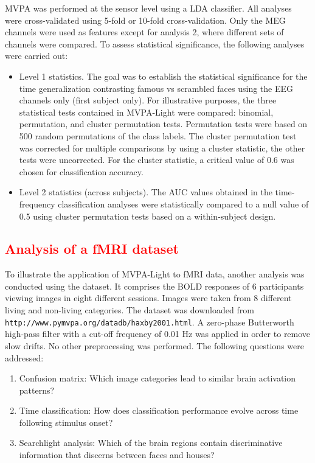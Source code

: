 \documentclass[utf8]{frontiersSCNS} %
\newcommand{\ttt}[1]{\texttt{#1}}
\newcommand{\red}[1]{\textcolor{red}{#1}}
\begin{document}
MVPA was performed at the sensor level using a LDA classifier. All analyses were cross-validated using 5-fold or 10-fold cross-validation. Only the MEG channels were used as features except for analysis 2, where different sets of channels were compared. To assess statistical significance, the following analyses were carried out:

\begin{itemize}
    \item Level 1 statistics. The goal was to establish the statistical significance for the time generalization contrasting famous vs scrambled faces using the EEG channels only (first subject only). For illustrative purposes, the three statistical tests contained in MVPA-Light were compared: binomial, permutation, and cluster permutation tests. Permutation tests were based on 500 random permutations of the class labels. The cluster permutation test was corrected for multiple comparisons by using a cluster statistic, the other tests were uncorrected. For the cluster statistic, a critical value of 0.6 was chosen for  classification accuracy.
    \item Level 2 statistics (across subjects). The AUC values obtained in the time-frequency classification analyses were statistically compared to a null value of 0.5 using cluster permutation tests based on a within-subject design.
    
\end{itemize}

\red{\subsection{Analysis of a fMRI dataset}}
To illustrate the application of MVPA-Light to fMRI data, another analysis was conducted using the \cite{Haxby2001} dataset. It comprises the BOLD responses of 6 participants viewing images in eight different sessions. Images were taken from 8 different living and non-living categories. The dataset was downloaded from \ttt{http://www.pymvpa.org/datadb/haxby2001.html}. A zero-phase Butterworth high-pass filter with a cut-off frequency of 0.01 Hz was applied in order to remove slow drifts. No other preprocessing was performed. The following questions were addressed:

\begin{enumerate}
    \item Confusion matrix: Which image categories lead to similar brain activation patterns?
    \item Time classification: How does classification performance evolve across time following stimulus onset?
    \item Searchlight analysis: Which of the brain regions contain discriminative information that discerns between faces and houses?
\end{enumerate}
\end{document}
